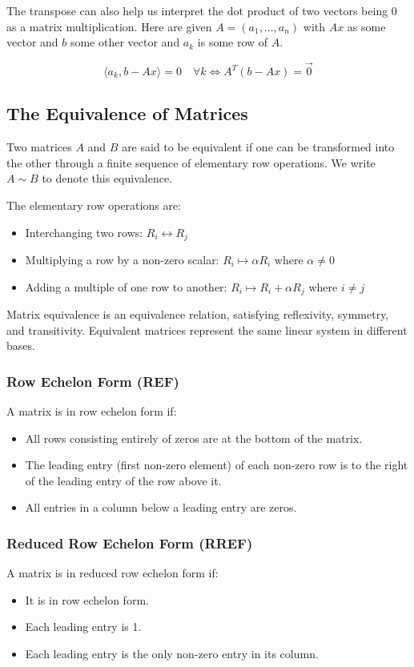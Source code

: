 The transpose can also help us interpret the dot product of two vectors being 0 as a matrix multiplication.
Here are given \(A = (a_1, \dots, a_n)\) with \(Ax\) as some vector and \(b\) some other vector and 
\(a_k\) is some row of \(A\).

\[
\langle a_k, b - Ax \rangle = 0 \quad \forall k \iff A^{T} (b - Ax) = \vec{0}
\]

\subsection{The Equivalence of Matrices}

Two matrices \(A\) and \(B\) are said to be equivalent if one can be transformed into the other through a finite sequence of elementary row operations. We write \(A \sim B\) to denote this equivalence.

The elementary row operations are:
\begin{itemize}[label=\(-\)]
    \item Interchanging two rows: \(R_i \leftrightarrow R_j\)
    \item Multiplying a row by a non-zero scalar: \(R_i \mapsto \alpha R_i\) where \(\alpha \neq 0\)
    \item Adding a multiple of one row to another: \(R_i \mapsto R_i + \alpha R_j\) where \(i \neq j\)
\end{itemize}

Matrix equivalence is an equivalence relation, satisfying reflexivity, symmetry, and transitivity. Equivalent matrices represent the same linear system in different bases.

\subsubsection{Row Echelon Form (REF)}

A matrix is in row echelon form if:
\begin{itemize}[label=\(-\)]
    \item All rows consisting entirely of zeros are at the bottom of the matrix.
    \item The leading entry (first non-zero element) of each non-zero row is to the right of the leading entry of the row above it.
    \item All entries in a column below a leading entry are zeros.
\end{itemize}

\subsubsection{Reduced Row Echelon Form (RREF)}
A matrix is in reduced row echelon form if:
\begin{itemize}[label=\(-\)]
    \item It is in row echelon form.
    \item Each leading entry is 1.
    \item Each leading entry is the only non-zero entry in its column.
\end{itemize}

